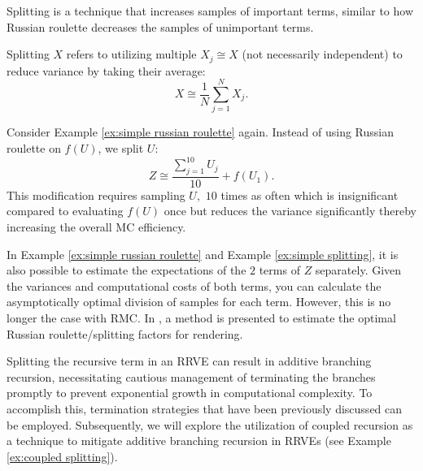 \documentclass[a4paper,12pt]{article}
\begin{document}
Splitting is a technique that increases samples of important terms, similar to how Russian roulette
decreases the samples of unimportant terms.

\begin{definition}[splitting] \label{def:splitting}
  Splitting $X$ refers to utilizing multiple $X_{j} \cong X$ (not necessarily independent) to
  reduce variance by taking their average:
  \begin{equation}
    X \cong \frac{1}{N} \sum_{j=1}^{N} X_{j}.
  \end{equation}
\end{definition}

\begin{example} \label{ex:simple splitting}
  Consider Example \ref{ex:simple russian roulette} again.
  Instead of using Russian roulette on $f(U)$, we split $U$:
  \begin{equation}
    Z \cong \frac{\sum_{j=1}^{10} U_j}{10} + f(U_{1}).
  \end{equation}
  This modification requires sampling $U,$
  $10$ times as often which is insignificant compared to evaluating $f(U)$ once
  but reduces the variance significantly thereby increasing the overall MC efficiency.\\
\end{example}

\begin{related}
  In Example \ref{ex:simple russian roulette} and Example \ref{ex:simple splitting},
  it is also possible to estimate the expectations of the $2$ terms
  of $Z$ separately. Given the variances and computational costs
  of both terms, you can calculate the asymptotically optimal division
  of samples for each term. However, this is no longer the case with RMC.
  In \cite{rath_ears_2022}, a method is presented to estimate the optimal
  Russian roulette/splitting factors for rendering.
\end{related}

Splitting the recursive term in an RRVE can result in additive branching recursion,
necessitating cautious management of terminating the branches promptly to prevent
exponential growth in computational complexity. To accomplish this, termination
strategies that have been previously discussed can be employed. Subsequently,
we will explore the utilization of coupled recursion as a technique to mitigate
additive branching recursion in RRVEs (see Example \ref{ex:coupled splitting}).
\end{document}
